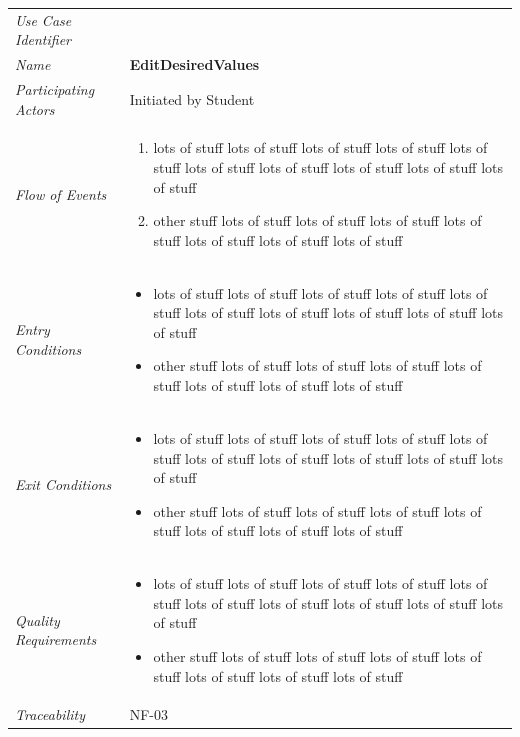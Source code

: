 \documentclass[12pt,letterpaper]{article}
\begin{document}
\begin{center}
	\begin{tabu} to 
		\toprule
		Use Case Identifier & \editdesiredvalues{} \\
		Name & {\bf EditDesiredValues} \\
		Participating Actors & Initiated by Student \\
		Flow of Events & 
	    \begin{enumerate}[topsep=-1em]
		    \item lots of stuff lots of stuff lots of stuff lots of stuff lots of stuff lots of stuff lots of stuff lots of stuff lots of stuff lots of stuff
		    \item other stuff lots of stuff lots of stuff lots of stuff lots of stuff lots of stuff lots of stuff lots of stuff
		\end{enumerate} \\

		Entry Conditions &
		\begin{itemize}[topsep=-1em]
		    \item lots of stuff lots of stuff lots of stuff lots of stuff lots of stuff lots of stuff lots of stuff lots of stuff lots of stuff lots of stuff
		    \item other stuff lots of stuff lots of stuff lots of stuff lots of stuff lots of stuff lots of stuff lots of stuff
        \end{itemize} \\

		Exit Conditions &
		\begin{itemize}[topsep=-1em]
		    \item lots of stuff lots of stuff lots of stuff lots of stuff lots of stuff lots of stuff lots of stuff lots of stuff lots of stuff lots of stuff
		    \item other stuff lots of stuff lots of stuff lots of stuff lots of stuff lots of stuff lots of stuff lots of stuff
        \end{itemize} \\

		Quality Requirements &
		\begin{itemize}[topsep=-1em]
		    \item lots of stuff lots of stuff lots of stuff lots of stuff lots of stuff lots of stuff lots of stuff lots of stuff lots of stuff lots of stuff
		    \item other stuff lots of stuff lots of stuff lots of stuff lots of stuff lots of stuff lots of stuff lots of stuff
        \end{itemize} \\

		Traceability & NF-03 \\
		\toprule
	\end{tabu}
\end{center}
\end{document}
